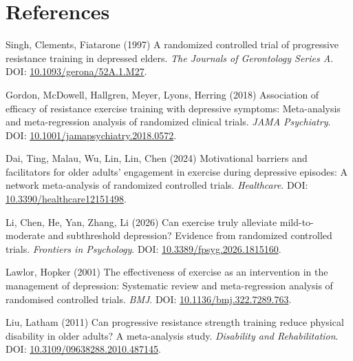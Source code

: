 \documentclass[
  letterpaper,
  DIV=11,
  numbers=noendperiod]{scrartcl}
\newlength{\cslhangindent}
\newenvironment{CSLReferences}[2] %
 {\begin{list}{}{%
  \setlength{\itemindent}{0pt}
  \setlength{\leftmargin}{0pt}
  \setlength{\parsep}{0pt}
  \ifodd #1
   \setlength{\leftmargin}{\cslhangindent}
   \setlength{\itemindent}{-1\cslhangindent}
  \fi
  \setlength{\itemsep}{#2\baselineskip}}}
 {\end{list}}
\begin{document}
\clearpage

\section*{References}\label{references}

\protect{}\label{refs}
\begin{CSLReferences}{0}{1}
Singh, Clements, Fiatarone (1997) A randomized controlled trial of
progressive resistance training in depressed elders. \emph{The Journals
of Gerontology Series A}. DOI:
\href{https://doi.org/10.1093/gerona/52A.1.M27}{10.1093/gerona/52A.1.M27}.

Gordon, McDowell, Hallgren, Meyer, Lyons, Herring (2018) Association of
efficacy of resistance exercise training with depressive symptoms:
Meta-analysis and meta-regression analysis of randomized clinical
trials. \emph{JAMA Psychiatry}. DOI:
\href{https://doi.org/10.1001/jamapsychiatry.2018.0572}{10.1001/jamapsychiatry.2018.0572}.

Dai, Ting, Malau, Wu, Lin, Lin, Chen (2024) Motivational barriers and
facilitators for older adults' engagement in exercise during depressive
episodes: A network meta-analysis of randomized controlled trials.
\emph{Healthcare}. DOI:
\href{https://doi.org/10.3390/healthcare12151498}{10.3390/healthcare12151498}.

Li, Chen, He, Yan, Zhang, Li (2026) Can exercise truly alleviate
mild-to-moderate and subthreshold depression? Evidence from randomized
controlled trials. \emph{Frontiers in Psychology}. DOI:
\href{https://doi.org/10.3389/fpsyg.2026.1815160}{10.3389/fpsyg.2026.1815160}.

Lawlor, Hopker (2001) The effectiveness of exercise as an intervention
in the management of depression: Systematic review and meta-regression
analysis of randomised controlled trials. \emph{BMJ}. DOI:
\href{https://doi.org/10.1136/bmj.322.7289.763}{10.1136/bmj.322.7289.763}.

Liu, Latham (2011) Can progressive resistance strength training reduce
physical disability in older adults? A meta-analysis study.
\emph{Disability and Rehabilitation}. DOI:
\href{https://doi.org/10.3109/09638288.2010.487145}{10.3109/09638288.2010.487145}.


\end{CSLReferences}
\end{document}
